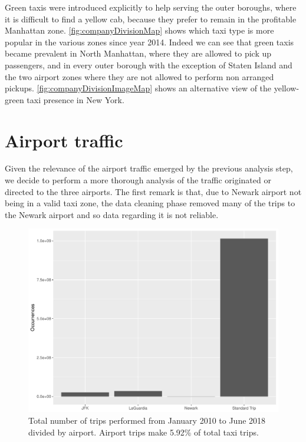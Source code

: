 \documentclass{acm_proc_article-sp-sigmod09}
\begin{document}
Green taxis were introduced explicitly to help serving the outer boroughs, where it is difficult to find a yellow cab, because they prefer to remain in the profitable Manhattan zone. \cref{fig:companyDivisionMap} shows which taxi type is more popular in the various zones since year 2014. Indeed we can see that green taxis became prevalent in North Manhattan, where they are allowed to pick up passengers, and in every outer borough with the exception of Staten Island and the two airport zones where they are not allowed to perform non arranged pickups. \cref{fig:companyDivisionImageMap} shows an alternative view of the yellow-green taxi presence in New York.

\section{Airport traffic}

Given the relevance of the airport traffic emerged by the previous analysis step, we decide to perform a more thorough analysis of the traffic originated or directed to the three airports. The first remark is that, due to Newark airport not being in a valid taxi zone, the data cleaning phase removed many of the trips to the Newark airport and so data regarding it is not reliable.

\begin{figure}
	\centering
	\includegraphics[width=1\columnwidth]{resources/airport/airport_distr.pdf}
	\caption{Total number of trips performed from January 2010 to June 2018 divided by airport. Airport trips make 5.92\% of total taxi trips.}
	\label{fig:airportDistr}
\end{figure}
\end{document}
